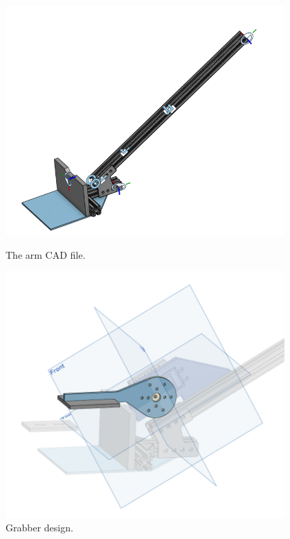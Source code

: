 \begin{figure}[ht]
\centering
\begin{minipage}[b]{.48\textwidth}
  \centering
  \includegraphics[width=0.95\textwidth]{Meetings/October/10-11-21/10-11-21_Hardware_Figure3 - Nathan Forrer.PNG}
  \caption{The arm CAD file.}
  \label{fig:101121_3}
\end{minipage}%
\hfill%
\begin{minipage}[b]{.48\textwidth}
  \centering
  \includegraphics[width=0.95\textwidth]{Meetings/October/10-11-21/10-11-21_Hardware_Figure4 - Nathan Forrer.PNG}
  \caption{Grabber design.}
  \label{fig:101121_4}
\end{minipage}
\end{figure}

